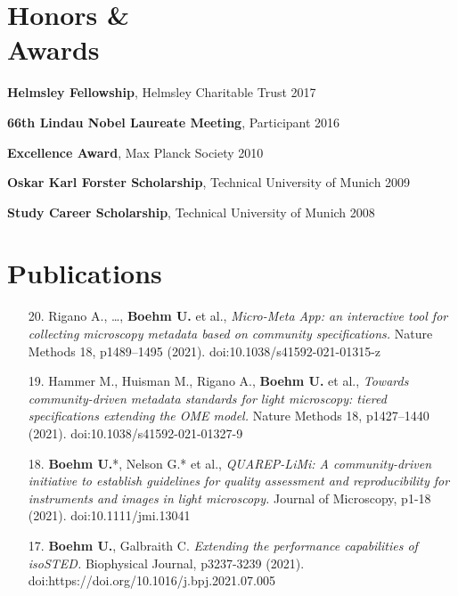 \documentclass[margin,line]{res}
\begin{document}
\begin{resume}

\section{\sc Honors \& \\Awards} 
{\bf Helmsley Fellowship}, Helmsley Charitable Trust  \hfill 2017

\vspace*{-3mm}
{\bf 66th Lindau Nobel Laureate Meeting}, Participant \hfill {2016}

\vspace*{-3mm}
{\bf Excellence Award}, Max Planck Society \hfill 2010

\vspace*{-3mm}
{\bf Oskar Karl Forster Scholarship}, Technical University of Munich  \hfill 2009

\vspace*{-3mm}
{\bf Study Career Scholarship}, Technical University of Munich  \hfill 2008


\section{\sc Publications}

\begin{enumerate}[leftmargin=*]

\item[20.] Rigano A., \dots, {\bf Boehm U.} et al., {\it Micro-Meta App: an interactive tool for collecting microscopy metadata based on community specifications.} Nature Methods 18, p1489–1495 (2021). doi:10.1038/s41592-021-01315-z

\item[19.] Hammer M., Huisman M., Rigano A., {\bf Boehm U.} et al., {\it Towards community-driven metadata standards for light microscopy: tiered specifications extending the OME model.} Nature Methods 18, p1427–1440 (2021). doi:10.1038/s41592-021-01327-9

\item[18.] {\bf Boehm U.}*, Nelson G.* et al., {\it QUAREP-LiMi: A community-driven initiative to establish guidelines for quality assessment and reproducibility for instruments and images in light microscopy.} Journal of Microscopy, p1-18 (2021). doi:10.1111/jmi.13041

\item[17.] {\bf Boehm U.}, Galbraith C. {\it Extending the performance capabilities of isoSTED.} Biophysical Journal, p3237-3239 (2021). doi:https://doi.org/10.1016/j.bpj.2021.07.005


\end{enumerate}
\end{resume}
\end{document}
